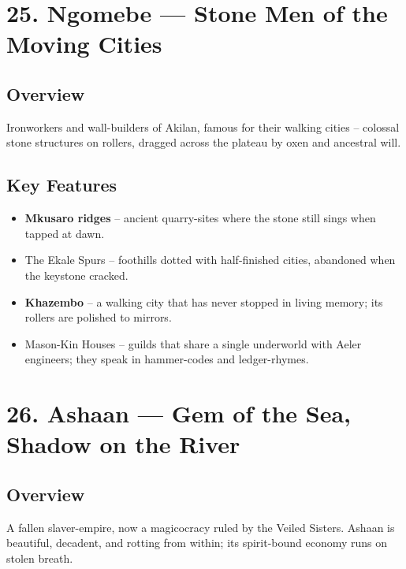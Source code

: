 \documentclass[11pt]{article}
\begin{document}
\section*{25. Ngomebe --- Stone Men of the Moving Cities}

\subsection*{Overview}
Ironworkers and wall-builders of Akilan, famous for their walking cities -- colossal stone structures on rollers, dragged across the plateau by oxen and ancestral will.

\subsection*{Key Features}
\begin{itemize}[leftmargin=*]
    \item \textbf{Mkusaro ridges} -- ancient quarry-sites where the stone still sings when tapped at dawn.
    \item The Ekale Spurs -- foothills dotted with half-finished cities, abandoned when the keystone cracked.
    \item \textbf{Khazembo} -- a walking city that has never stopped in living memory; its rollers are polished to mirrors.
    \item Mason-Kin Houses -- guilds that share a single underworld with Aeler engineers; they speak in hammer-codes and ledger-rhymes.
\end{itemize}

\section*{26. Ashaan --- Gem of the Sea, Shadow on the River}

\subsection*{Overview}
A fallen slaver-empire, now a magicocracy ruled by the Veiled Sisters. Ashaan is beautiful, decadent, and rotting from within; its spirit-bound economy runs on stolen breath.
\end{document}
